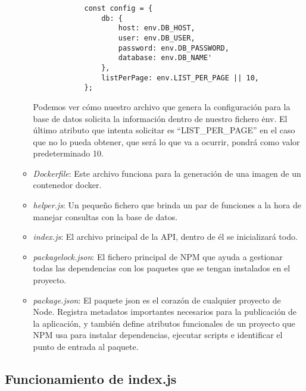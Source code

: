 \begin{itemize}
\begin{itemize}
                    \begin{verbatim}
            const config = {
                db: {
                    host: env.DB_HOST,
                    user: env.DB_USER,
                    password: env.DB_PASSWORD,
                    database: env.DB_NAME'
                },
                listPerPage: env.LIST_PER_PAGE || 10,
            };
        \end{verbatim}
                    \begin{tcolorbox}
                        [colback=green!5!white,colframe=green!75!black,fonttitle=\bfseries,title=Utilización del archivo .env]
                        Podemos ver cómo nuestro archivo que genera la configuración para la base de datos solicita la información dentro de nuestro fichero \.env. El último atributo que intenta solicitar es ``LIST\_PER\_PAGE'' en el caso que no lo pueda obtener, que será lo que va a ocurrir, pondrá como valor predeterminado 10.
                    \end{tcolorbox}
              \item \textit{Dockerfile}: Este archivo funciona para la generación de una imagen de un contenedor docker.
              \item \textit{helper.js}: Un pequeño fichero que brinda un par de funciones a la hora de manejar consultas con la base de datos.
              \item \textit{index.js}: El archivo principal de la API, dentro de él se inicializará todo.
              \item \textit{package\-lock.json}: El fichero principal de NPM que ayuda a gestionar todas las dependencias con los paquetes que se tengan instalados en el proyecto.
              \item \textit{package.json}: El paquete json es el corazón de cualquier proyecto de Node. Registra metadatos importantes necesarios para la publicación de la aplicación, y también define atributos funcionales de un proyecto que NPM usa para instalar dependencias, ejecutar scripts e identificar el punto de entrada al paquete.
          \end{itemize}
\end{itemize}

\subsection{Funcionamiento de index.js}

